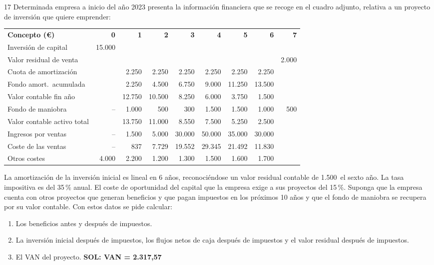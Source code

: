 \documentclass[10pt,a4paper,twoside]{article}
\newcommand{\eur}{\,\text{€}\xspace}
\newenvironment{opciones}{\begin{enumerate}[label={\sffamily\bfseries\color{steel}\alph*)},
  leftmargin=1.6em,itemsep=1pt,topsep=2pt]}{\end{enumerate}}
\newcommand{\thead}[1]{\leavevmode\sffamily\bfseries\color{white}#1}
\newcommand{\headrow}{\rowcolor{steel}}
\begin{document}
\begin{enunciado}{17}
Determinada empresa a inicio del año 2023 presenta la información financiera que se recoge en el cuadro adjunto,
relativa a un proyecto de inversión que quiere emprender:

\begingroup\scriptsize\setlength{\tabcolsep}{2.6pt}
\begin{tabularx}{\linewidth}{@{}>{\raggedright\arraybackslash}p{2.75cm} *{8}{R}@{}}
\headrow \thead{Concepto (€)} & \thead{0} & \thead{1} & \thead{2} & \thead{3} & \thead{4} & \thead{5} & \thead{6} & \thead{7}\\
Inversión de capital & 15.000 & & & & & & & \\
Valor residual de venta & & & & & & & & 2.000\\
Cuota de amortización & & 2.250 & 2.250 & 2.250 & 2.250 & 2.250 & 2.250 & \\
Fondo amort.\ acumulada & & 2.250 & 4.500 & 6.750 & 9.000 & 11.250 & 13.500 & \\
Valor contable fin año & & 12.750 & 10.500 & 8.250 & 6.000 & 3.750 & 1.500 & \\
Fondo de maniobra & -- & 1.000 & 500 & 300 & 1.500 & 1.500 & 1.000 & 500\\
Valor contable activo total & & 13.750 & 11.000 & 8.550 & 7.500 & 5.250 & 2.500 & \\
Ingresos por ventas & -- & 1.500 & 5.000 & 30.000 & 50.000 & 35.000 & 30.000 & \\
Coste de las ventas & -- & 837 & 7.729 & 19.552 & 29.345 & 21.492 & 11.830 & \\
Otros costes & 4.000 & 2.200 & 1.200 & 1.300 & 1.500 & 1.600 & 1.700 & \\
\end{tabularx}
\endgroup

\smallskip
La amortización de la inversión inicial es lineal en 6 años, reconociéndose un valor residual contable de 1.500\eur el
sexto año. La tasa impositiva es del 35\,\% anual. El coste de oportunidad del capital que la empresa exige a sus
proyectos del 15\,\%. Suponga que la empresa cuenta con otros proyectos que generan beneficios y que pagan impuestos en
los próximos 10 años y que el fondo de maniobra se recupera por su valor contable. Con estos datos se pide calcular:
\begin{opciones}
  \item Los beneficios antes y después de impuestos.
  \item La inversión inicial después de impuestos, los flujos netos de caja después de impuestos y el valor residual
        después de impuestos.
  \item El VAN del proyecto. \textbf{SOL: VAN = 2.317,57\eur}
\end{opciones}
\end{enunciado}
\end{document}
